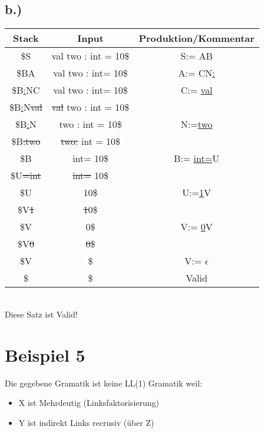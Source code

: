 \documentclass[12pt,runningheads,a4paper]{llncs}
\begin{document}
 \subsection*{b.)}
\begin{tabular}{ |c|c|c|  }

 \hline
 Stack&Input &Produktion/Kommentar\\ 
 \hline
 \$S &val two : int = 10\$ &S:= AB \\
  \hline
 \$BA &val two : int= 10\$ &A:= CN\underline{:}\\
 \hline
 \$B\underline{:}NC &val two : int= 10\$ &C:= \underline{val}\\
 \hline
 \$B\underline{:}N\st{val} &\st{val} two : int = 10\$ &\\
   \hline
 \$B\underline{:}N &two : int = 10\$ &N:=\underline{two} \\
   \hline
 \$B\st{:}\st{two} &\st{two}\st{:} int = 10\$ & \\
   \hline
 \$B &int= 10\$ & B:= \underline{int}\underline{=}U \\
   \hline
 \$U\st{=}\st{int} &\st{int}\st{=} 10\$ & \\
   \hline
 \$U  &10\$ & U:=\underline{1}V \\
   \hline
 \$V\st{1} &\st{1}0\$ &\\
   \hline
 \$V &0\$ &V:= \underline{0}V\\
   \hline
 \$V\st{0}  &\st{0}\$ & \\
   \hline
 \$V  &\$  &V:= $\epsilon$\\
   \hline
 \$ &\$ &Valid \\
 \hline

 \end{tabular}\\
Diese Satz ist Valid!
\\

\newpage
\section*{Beispiel 5}
Die gegebene Gramatik ist keine LL(1) Gramatik weil:
\begin{itemize}
\item X ist Mehrdeutig (Linksfaktorisierung)
\item Y ist indirekt Links recrusiv (über Z)
\end{itemize}
\end{document}
